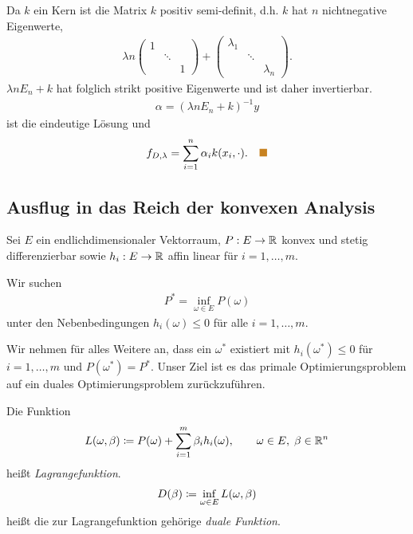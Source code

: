 \begin{bsp*}
Da $k$ ein Kern ist die Matrix $k$ positiv semi-definit, d.h. $k$ hat $n$
nichtnegative Eigenwerte,
\begin{align*}
\lambda n 
\begin{pmatrix}
1 \\
 &\ddots \\
 && 1
\end{pmatrix}
+
\begin{pmatrix}
\lambda_1 \\
 & \ddots \\
  & & \lambda_n
\end{pmatrix}.
\end{align*}
$\lambda n E_n + k$ hat folglich strikt positive Eigenwerte  und ist daher
invertierbar.
\begin{align*}
\alpha = (\lambda n E_n + k)^{-1}y
\end{align*}
ist die eindeutige Lösung und
\begin{align*}
f_{D,\lambda} = \sum_{i=1}^n \alpha_i k(x_i,\cdot).\bsphere
\end{align*}
\end{bsp*}

\subsection{Ausflug in das Reich der konvexen Analysis}

Sei $E$ ein endlichdimensionaler Vektorraum, $P: E\to\mathbb{R}$ konvex und stetig
differenzierbar sowie $h_i : E\to \mathbb{R}$ affin linear für $i=1,\ldots,m$.

\begin{defn*}
Wir suchen
\begin{align*}
P^* = \inf_{\omega\in E} P(\omega)
\end{align*}
unter den Nebenbedingungen $h_i(\omega) \le 0$ für alle $i=1,\ldots,m$.\fishhere
\end{defn*}

Wir nehmen für alles Weitere an, dass ein $\omega^*$ existiert mit
$h_i(\omega^*) \le 0$ für $i=1,\ldots,m$ und $P(\omega^*) = P^*$. Unser Ziel ist
es das primale Optimierungsproblem auf ein duales Optimierungsproblem
zurückzuführen.

\begin{defn*}
Die Funktion
\begin{align*}
L(\omega,\beta) \coloneq P(\omega) + \sum_{i=1}^m \beta_i h_i(\omega),\qquad \omega\in
E,\; \beta\in\mathbb{R}^n
\end{align*}
heißt \emph{Lagrangefunktion}.
\begin{align*}
D(\beta) \coloneq \inf_{\omega\in E} L(\omega, \beta)
\end{align*}
heißt die zur Lagrangefunktion gehörige \emph{duale Funktion}.\fishhere
\end{defn*}

